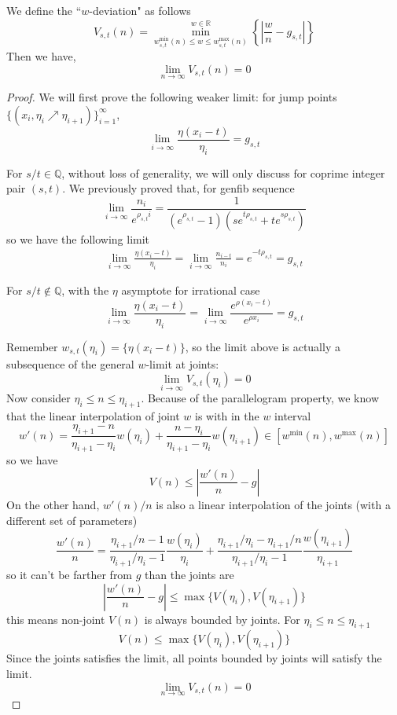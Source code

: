 \documentclass[]{article}
\begin{document}
\vspace{1cm}
\begin{lemma}[$w$ limit]
	We define the ``$w$-deviation" as follows
	\[
		V_{s,t}(n) = \min_{w_{s,t}^{\min}(n)\le w \le w_{s,t}^{\max}(n)}^{w\in\mathbb{R}} \left\{ \left|\frac{w}{n} - g_{s,t}\right| \right\}
	\]
	Then we have, 
	\[
	\lim_{n\to\infty} V_{s,t}(n) = 0
	\]
\end{lemma}
\begin{proof}
	We will first prove the following weaker limit: for jump points $\{(x_i, \eta_i\nearrow\eta_{i+1})\}_{i=1}^\infty$, 
	\[
	\lim_{i\to\infty} \frac{\eta(x_i - t)}{\eta_i} = g_{s,t}
	\]
	
	For $s/t\in\mathbb{Q}$, without loss of generality, we will only discuss for coprime integer pair $(s, t)$. We previously proved that, for genfib sequence
	\[
	\lim_{i\to\infty}    \frac{n_i}{e^{\rho_{s,t} i}} = \frac{1}{( e^{\rho_{s,t}} - 1)(s e^{t\rho_{s,t}} + t e^{s\rho_{s,t}})}
	\]
	so we have the following limit
	\begin{align*}
	\lim_{i\to\infty} \frac{\eta(x_i - t)}{\eta_i} = \lim_{i\to\infty} \frac{n_{i-t}}{n_i}= e^{-t\rho_{s,t}}	= g_{s,t}
	\end{align*}
	
	For $s/t\notin\mathbb{Q}$, with the $\eta$ asymptote for irrational case
	\[
	\lim_{i\to\infty} \frac{\eta(x_i - t)}{\eta_i} = \lim_{i\to\infty} \frac{e^{\rho(x_i-t)}}{e^{\rho x_i}}  = g_{s,t}
	\]
	
	Remember $w_{s,t}(\eta_i) = \{\eta(x_i - t)\}$, so the limit above is actually a subsequence of the general $w$-limit at joints:
	\[
	\lim_{i\to\infty} V_{s,t}(\eta_i) = 0
	\]
	Now consider $\eta_i\le n \le \eta_{i+1}$. Because of the parallelogram property, we know that the linear interpolation of joint $w$ is with in the $w$ interval 
	\[
		w'(n) = \frac{\eta_{i+1} - n}{\eta_{i+1} - \eta_{i}} w(\eta_i) + \frac{n - \eta_{i}}{\eta_{i+1} - \eta_{i}} w(\eta_{i+1}) \in [w^{\min}(n), w^{\max}(n)]
	\]
	so we have
	\[
	V(n) \le \left|\frac{w'(n)}{n} - g\right|
	\]
	On the other hand, $w'(n)/n$ is also a linear interpolation of the joints (with a different set of parameters)
	\[
	\frac{w'(n)}{n} = \frac{\eta_{i+1}/n-1}{\eta_{i+1}/\eta_i-1} \frac{w(\eta_i)}{\eta_i} + \frac{\eta_{i+1}/\eta_i - \eta_{i+1}/n}{\eta_{i+1}/\eta_i-1} \frac{w(\eta_{i+1})}{\eta_{i+1}}
	\]
	so it can't be farther from $g$ than the joints are
	\[
	\left|\frac{w'(n)}{n} - g\right| \le \max\{ V(\eta_i), V(\eta_{i+1}) \}
	\]
	this means non-joint $V(n)$ is always bounded by joints. For $\eta_i\le n \le \eta_{i+1}$
	\[
	V(n) \le \max\{ V(\eta_i), V(\eta_{i+1}) \}
	\]
	Since the joints satisfies the limit, all points bounded by joints will satisfy the limit.
	\[
	\lim_{n\to\infty} V_{s,t}(n) = 0
	\]
\end{proof}
\end{document}
